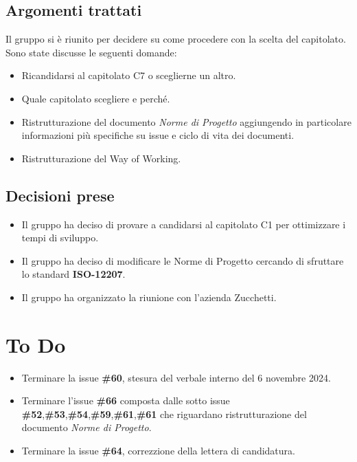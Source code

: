 \documentclass[a4paper, 12pt]{article}
\begin{document}
\subsection{Argomenti trattati}
Il gruppo si è riunito per decidere su come procedere con la scelta del capitolato. Sono state discusse le seguenti domande:
\begin{itemize}
    \item Ricandidarsi al capitolato C7 o sceglierne un altro.
    \item Quale capitolato scegliere e perché.
    \item Ristrutturazione del documento \textit{Norme di Progetto} aggiungendo in particolare informazioni più specifiche su issue e ciclo di vita dei documenti.
    \item Ristrutturazione del Way of Working.
\end{itemize}
\subsection{Decisioni prese}
\begin{itemize}
    \item Il gruppo ha deciso di provare a candidarsi al capitolato C1 per ottimizzare i tempi di sviluppo.
    \item Il gruppo ha deciso di modificare le Norme di Progetto cercando di sfruttare lo standard \textbf{ISO-12207}.
    \item Il gruppo ha organizzato la riunione con l'azienda Zucchetti.
\end{itemize}
\section{To Do}
\begin{itemize}
\item Terminare la issue \textbf{\#60}, stesura del verbale interno del 6 novembre 2024.
\item Terminare l'issue \textbf{\#66} composta dalle sotto issue \textbf{\#52},\textbf{\#53},\textbf{\#54},\textbf{\#59},\textbf{\#61},\textbf{\#61} che riguardano
ristrutturazione del documento \textit{Norme di Progetto}.
\item Terminare la issue \textbf{\#64}, correzzione della lettera di candidatura.
\end{itemize}
\end{document}

